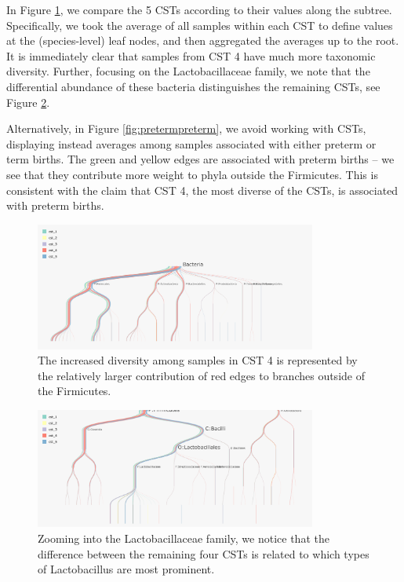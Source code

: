 \documentclass[12pt]{article}
\begin{document}
In Figure \ref{fig:pretermcsts}, we compare the 5 CSTs according to
their values along the subtree. Specifically, we took the average of all
samples within each CST to define values at the (species-level) leaf
nodes, and then aggregated the averages up to the root. It is
immediately clear that samples from CST 4 have much more taxonomic
diversity. Further, focusing on the Lactobacillaceae family, we note
that the differential abundance of these bacteria distinguishes the
remaining CSTs, see Figure \ref{fig:pretermcstslacto}.

Alternatively, in Figure \ref{fig:pretermpreterm}, we avoid working with CSTs,
displaying instead averages among samples associated with either preterm or term
births. The green and yellow edges are associated with preterm births -- we see
that they contribute more weight to phyla outside the Firmicutes. This is
consistent with the claim that CST 4, the most diverse of the CSTs, is
associated with preterm births.

\begin{figure}

{\centering \includegraphics[width=350px]{figure/preterm_csts}

}

\caption{The increased diversity among samples in CST 4 is represented by the
  relatively larger contribution of red edges to branches outside of the
  Firmicutes.}\label{fig:pretermcsts}
\end{figure}

\begin{figure}

{\centering \includegraphics[width=350px]{figure/preterm_csts_lacto}

}

\caption{Zooming into the Lactobacillaceae family, we notice that the difference
  between the remaining four CSTs is related to which types of Lactobacillus are
  most prominent.}\label{fig:pretermcstslacto}
\end{figure}
\end{document}
